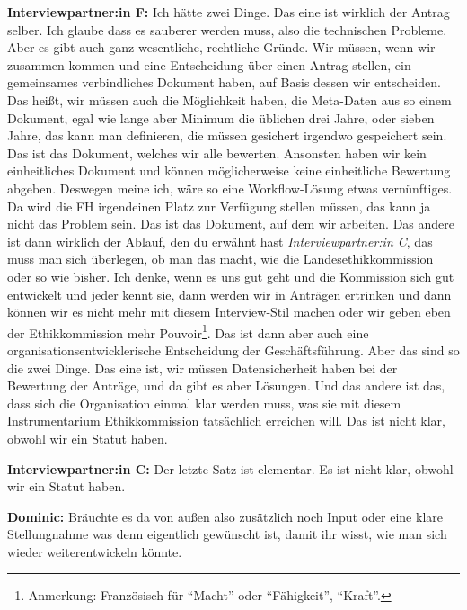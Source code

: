 \documentclass[a4paper,12pt,twoside]{scrreprt}
\begin{document}
\textbf{Interviewpartner:in F:} Ich hätte zwei Dinge. Das eine ist wirklich der Antrag selber. Ich glaube dass es sauberer werden muss, also die technischen Probleme. Aber es gibt auch ganz wesentliche, rechtliche Gründe. Wir müssen, wenn wir zusammen kommen und eine Entscheidung über einen Antrag stellen, ein gemeinsames verbindliches Dokument haben, auf Basis dessen wir entscheiden. Das heißt, wir müssen auch die Möglichkeit haben, die Meta-Daten aus so einem Dokument, egal wie lange aber Minimum die üblichen drei Jahre, oder sieben Jahre, das kann man definieren, die müssen gesichert irgendwo gespeichert sein. Das ist das Dokument, welches wir alle bewerten. Ansonsten haben wir kein einheitliches Dokument und können möglicherweise keine einheitliche Bewertung abgeben. Deswegen meine ich, wäre so eine Workflow-Lösung etwas vernünftiges. Da wird die FH irgendeinen Platz zur Verfügung stellen müssen, das kann ja nicht das Problem sein. Das ist das Dokument, auf dem wir arbeiten. Das andere ist dann wirklich der Ablauf, den du erwähnt hast \textit{Interviewpartner:in C}, das muss man sich überlegen, ob man das macht, wie die Landesethikkommission oder so wie bisher. Ich denke, wenn es uns gut geht und die Kommission sich gut entwickelt und jeder kennt sie, dann werden wir in Anträgen ertrinken und dann können wir es nicht mehr mit diesem Interview-Stil machen oder wir geben eben der Ethikkommission mehr Pouvoir\footnote{Anmerkung: Französisch für \enquote{Macht} oder \enquote{Fähigkeit}, \enquote{Kraft}.}. Das ist dann aber auch eine organisationsentwicklerische Entscheidung der Geschäftsführung. Aber das sind so die zwei Dinge. Das eine ist, wir müssen Datensicherheit haben bei der Bewertung der Anträge, und da gibt es aber Lösungen. Und das andere ist das, dass sich die Organisation einmal klar werden muss, was sie mit diesem Instrumentarium Ethikkommission tatsächlich erreichen will. Das ist nicht klar, obwohl wir ein Statut haben.

\textbf{Interviewpartner:in C:} Der letzte Satz ist elementar. Es ist nicht klar, obwohl wir ein Statut haben.

\textbf{Dominic:} Bräuchte es da von außen also zusätzlich noch Input oder eine klare Stellungnahme was denn eigentlich gewünscht ist, damit ihr wisst, wie man sich wieder weiterentwickeln könnte.
\end{document}
